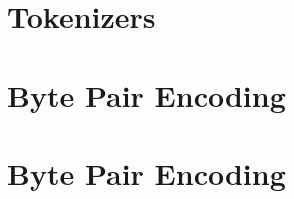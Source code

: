 \section{Tokenizers}
\label{sec:nlp_tokenizers}

\section{Byte Pair Encoding}

\section{Byte Pair Encoding}
